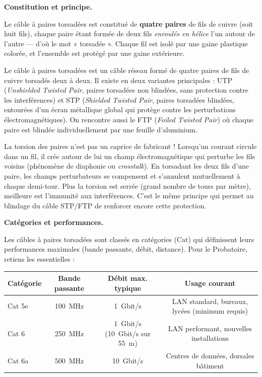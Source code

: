 \documentclass[11pt]{article}
\newcommand{\cle}[1]{{\popxbold\color{popdark}#1}}
\newcounter{popsec}
\newcounter{popsub}
\newcommand{\courssub}[1]{%
  \stepcounter{popsub}%
  \par\vspace{9pt}\noindent{\popxbold\fontsize{11.5}{13}\selectfont\color{popink}{\color{poporange}\thepopsec.\thepopsub}\hspace{6pt}#1}\par\nopagebreak\vspace{4pt}
}
\begin{document}
\courssub{Le câble à paires torsadées (UTP/STP)}

\textbf{Constitution et principe.}\par
Le câble à \cle{paires torsadées} est constitué de \textbf{quatre paires} de fils de cuivre (soit huit fils), chaque paire étant formée de deux fils \emph{enroulés en hélice} l'un autour de l'autre — d'où le mot « torsadée ». Chaque fil est isolé par une gaine plastique colorée, et l'ensemble est protégé par une gaine extérieure.

\begin{definition}
Le \cle{câble à paires torsadées} est un câble réseau formé de quatre paires de fils de cuivre torsadés deux à deux. Il existe en deux variantes principales : \cle{UTP} (\emph{Unshielded Twisted Pair}, paires torsadées non blindées, sans protection contre les interférences) et \cle{STP} (\emph{Shielded Twisted Pair}, paires torsadées blindées, entourées d'un écran métallique global qui protège contre les perturbations électromagnétiques). On rencontre aussi le \cle{FTP} (\emph{Foiled Twisted Pair}) où chaque paire est blindée individuellement par une feuille d'aluminium.
\end{definition}

\begin{savaistu}
La torsion des paires n'est pas un caprice de fabricant ! Lorsqu'un courant circule dans un fil, il crée autour de lui un champ électromagnétique qui perturbe les fils voisins (phénomène de \cle{diaphonie} ou \emph{crosstalk}). En torsadant les deux fils d'une paire, les champs perturbateurs se compensent et s'annulent mutuellement à chaque demi-tour. Plus la torsion est serrée (grand nombre de tours par mètre), meilleure est l'immunité aux interférences. C'est le même principe qui permet au blindage du câble STP/FTP de renforcer encore cette protection.
\end{savaistu}

\textbf{Catégories et performances.}\par
Les câbles à paires torsadées sont classés en \cle{catégories} (Cat) qui définissent leurs performances maximales (bande passante, débit, distance). Pour le Probatoire, retiens les essentielles :

\begin{center}
\begin{tabular}{|l|c|c|c|}
\hline
\rowcolor{popblueL} \textbf{Catégorie} & \textbf{Bande passante} & \textbf{Débit max. typique} & \textbf{Usage courant} \\
\hline
Cat 5e & \SI{100}{MHz} & \SI{1}{Gbit/s} & LAN standard, bureaux, lycées (minimum requis) \\
\hline
Cat 6 & \SI{250}{MHz} & \SI{1}{Gbit/s} (\SI{10}{Gbit/s} sur \SI{55}{m}) & LAN performant, nouvelles installations \\
\hline
Cat 6a & \SI{500}{MHz} & \SI{10}{Gbit/s} & Centres de données, dorsales bâtiment \\
\hline
\end{tabular}
\end{center}
\end{document}
